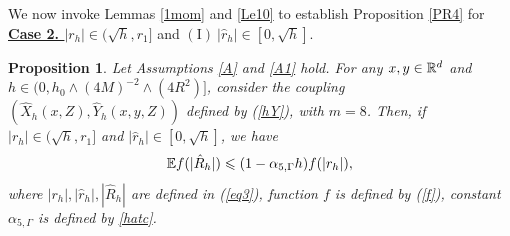 \documentclass[aap]{imsart}
\theoremstyle{plain}
\newtheorem{proposition}{Proposition}
\theoremstyle{definition}
\begin{document}
We now invoke Lemmas \ref{1mom} and \ref{Le10} to establish Proposition \ref{PR4} for \underline{\bf{Case 2. \textit{$|r_h|\in(\sqrt{h}, r_1]$}}}  and \underline{$(\mathrm{I})~|\hat{r}_h|\in[0, \sqrt{h}]$}. 
\begin{proposition}\label{PR2}
Let Assumptions \ref{A} and \ref{A1} hold. For any $x, y\in\mathbb{R}^d$ and \( h\in(0, h_0\wedge(4M)^{-2}\wedge (4R^2)]\), consider the coupling $(\hat{X}_h(x,Z), \hat{Y}_h(x,y,Z))$ defined by (\ref{hY}), with $m=8$. Then, if $|r_h|\in(\sqrt{h}, r_1]$ and $|\hat{r}_h|\in [0, \sqrt{h}]$, we have
\begin{equation*}
\mathbb{E} f(|\hat{R}_h|)\leqslant (1-\alpha_{5, \Gamma}h)f(|r_h|),
\end{equation*}
where $|r_h|, |\hat{r}_h|, |\hat{R}_h|$ are defined in (\ref{eq3}), function $f$ is defined by (\ref{f}), constant $\alpha_{5, \Gamma}$ is defined by \eqref{hatc}.
\end{proposition}
\end{document}
